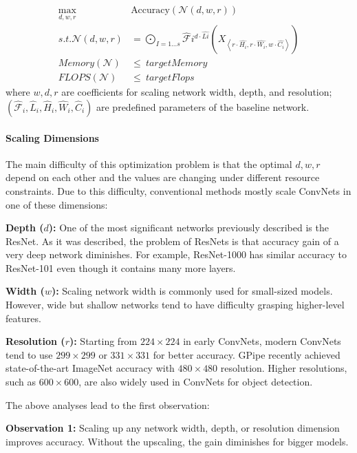 \documentclass[
]{krantz}
\begin{document}
\begin{align*}
\max_{d,w,r} &\text{Accuracy} \left( \mathcal{N}\left( d,w,r \right) \right) \\
s.t.\mathcal{N}\left( d,w,r \right) &=\bigodot_{I=1...s}\hat{\mathcal{F}}{i}^{d\cdot \hat{L{i}}}\left( X_{\left\langle r\cdot \hat{H_i},r\cdot \hat{W_i},w\cdot \hat{C_i}\right\rangle} \right) \\
Memory\left( \mathcal{N} \right) &\leq\ targetMemory \\
FLOPS\left( \mathcal{N} \right) &\leq\ targetFlops
\end{align*}
where \(w,d,r\) are coefficients for scaling network width, depth, and resolution; \(\left(\widehat{\mathcal{F}}_i, \widehat{L}_i, \widehat{H}_i, \widehat{W}_i, \widehat{C}_i \right)\) are predefined parameters of the baseline network.

\hypertarget{scaling-dimensions}{%
\paragraph{Scaling Dimensions}\label{scaling-dimensions}}

The main difficulty of this optimization problem is that the optimal \(d, w, r\) depend on each other and the values are changing under different resource constraints. Due to this difficulty, conventional methods mostly scale ConvNets in one of these dimensions:

\textbf{Depth (\(d\)):} One of the most significant networks previously described is the ResNet. As it was described, the problem of ResNets is that accuracy gain of a very deep network diminishes. For example, ResNet-1000 has similar accuracy to ResNet-101 even though it contains many more layers.

\textbf{Width (\(w\)):} Scaling network width is commonly used for small-sized models. However, wide but shallow networks tend to have difficulty grasping higher-level features.

\textbf{Resolution (\(r\)):} Starting from \(224\times 224\) in early ConvNets, modern ConvNets tend to use \(299\times 299\) or \(331\times 331\) for better accuracy. GPipe \citep{gpipe} recently achieved state-of-the-art ImageNet accuracy with \(480\times 480\) resolution. Higher resolutions, such as \(600\times 600\), are also widely used in ConvNets for object detection.

The above analyses lead to the first observation:

\textbf{Observation 1:} Scaling up any network width, depth, or resolution dimension improves accuracy. Without the upscaling, the gain diminishes for bigger models.
\end{document}
